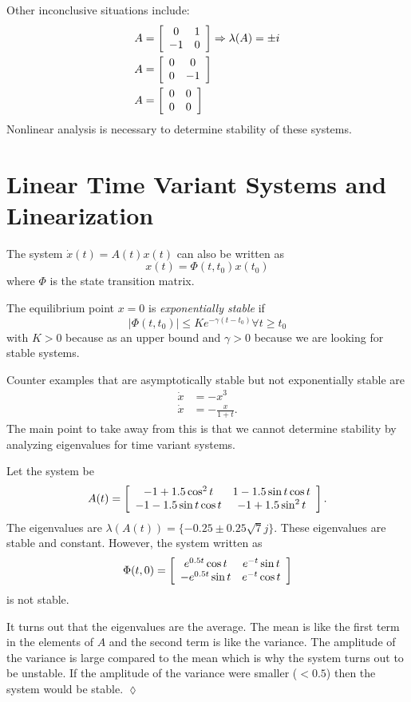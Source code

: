 Other inconclusive situations include:
\begin{align*}
A &= \left[\begin{array}{c c} 0 & 1 \\ -1 & 0 \end{array}\right] \Rightarrow\lambda(A)=\pm{}i \\
A &= \left[\begin{array}{c c} 0 & 0 \\ 0 & -1 \end{array}\right] \\
A &= \left[\begin{array}{c c} 0 & 0 \\ 0 & 0 \end{array}\right]
\end{align*}
Nonlinear analysis is necessary to determine stability of these systems.

\section{Linear Time Variant Systems and Linearization}
The system $\dot{x}(t) = A(t)x(t)$ can also be written as
$$x(t) = \Phi(t,t_0)x(t_0)$$
where $\Phi$ is the state transition matrix.

\begin{definition}
The equilibrium point $x=0$ is \textit{exponentially stable} if
$$|\Phi(t,t_0)| \leq Ke^{-\gamma(t-t_0)} \forall t\geq t_0$$
with $K>0$ because as an upper bound and $\gamma>0$ because we are looking for stable systems.
\end{definition}

Counter examples that are asymptotically stable but not exponentially stable are
\begin{align*}
\dot{x} &= -x^3 \\
\dot{x} &= -\frac{x}{1+t}.
\end{align*}
The main point to take away from this is that we cannot determine stability by analyzing eigenvalues for time variant systems.

\begin{example}
Let the system be
$$A(t) = \left[\begin{array}{c c} -1+1.5\cos^2t & 1-1.5\sin t\cos t \\ -1-1.5\sin t\cos t & -1+1.5\sin^2t \end{array}\right].$$
The eigenvalues are $\lambda(A (t)) = \{-0.25\pm{} 0.25\sqrt{7}j\}$.
These eigenvalues are stable and constant.
However, the system written as
$$\Phi(t,0) = \left[\begin{array}{c c} e^{0.5t}\cos t & e^{-t}\sin t \\ -e^{0.5t}\sin t & e^{-t}\cos t \end{array}\right]$$
is not stable.

It turns out that the eigenvalues are the average.
The mean is like the first term in the elements of $A$ and the second term is like the variance.
The amplitude of the variance is large compared to the mean which is why the system turns out to be unstable.
If the amplitude of the variance were smaller ($<0.5$) then the system would be stable.
$\lozenge$
\end{example}

